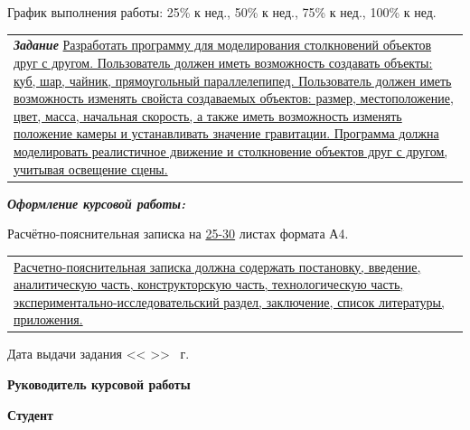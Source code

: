 \vspace{0.3cm}

\noindent График выполнения работы: 25\% к  нед., 50\% к  нед., 75\% к  нед., 100\% к  нед.

\vspace{0.3cm}

\noindent \begin{tabularx}{\linewidth}{@{}X@{}}
    \textbf{\textit{Задание}} \uline{
Разработать программу для моделирования столкновений объектов друг с другом. Пользователь должен иметь возможность создавать объекты: куб, шар, чайник, прямоугольный параллелепипед. Пользователь должен иметь возможность изменять свойста создаваемых объектов: размер, местоположение, цвет, масса, начальная скорость, а также иметь возможность изменять положение камеры и устанавливать значение гравитации. Программа должна моделировать реалистичное движение и столкновение объектов друг с другом, учитывая освещение сцены.
        \hfill}
\end{tabularx}

\vspace{0.3cm}

\noindent \textbf{\textit{Оформление курсовой работы:}}

\noindent Расчётно-пояснительная записка на \uline{25-30} листах формата А4.



\noindent \begin{tabularx}{\linewidth}{@{}X@{}}
    \uline{
Расчетно-пояснительная записка должна содержать постановку, введение, аналитическую часть, конструкторскую часть, технологическую часть, экспериментально-исследовательский раздел, заключение, список литературы, приложения.\hfill
        \hfill}
\end{tabularx}

\vspace{0.3cm}

\noindent Дата выдачи задания << \uline{\hspace{0.5cm}} >> \uline{\hspace{2cm}} \the\year \ г.

\vspace{0.3cm}

\noindent \textbf{Руководитель курсовой работы} \hfill {} 

\vspace{0.3cm}

\thispagestyle{empty}

\noindent \textbf{Студент} \hfill {} 

\vfill

